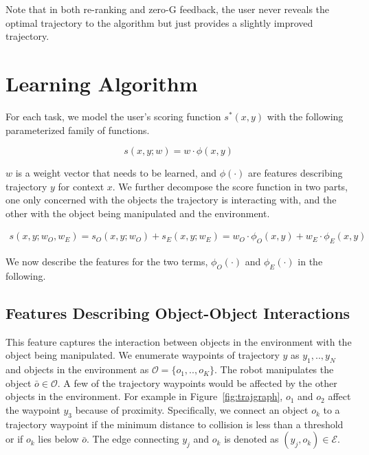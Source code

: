 Note that in both re-ranking and zero-G feedback, the user never reveals the optimal trajectory to the algorithm but just provides a slightly improved trajectory. 

\section{Learning Algorithm}

\label{sec:learningalgo}

For each task, we model the user's scoring function $s^*(x,y)$ with the following parameterized family of functions.

\begin{equation}
s(x,y;w) = w \cdot \phi(x,y)

\end{equation}

$w$ is a weight vector that needs to be learned, and $\phi(\cdot)$ are features describing trajectory $y$ for context $x$. We further decompose the score function in two parts, one only concerned with the objects the trajectory is interacting with, and the other with the object being manipulated and the environment.

\begin{align}
s(x,y;w_O,w_E) = s_O(x,y;w_O) + s_E(x,y;w_E) = w_O \cdot \phi_O(x,y) + w_E \cdot \phi_E(x,y)
\label{eq:scorefn}
\end{align}

We now describe the features for the two terms, $\phi_O(\cdot)$ and $\phi_E(\cdot)$ in the following.

\subsection{Features Describing Object-Object Interactions}

This feature captures the interaction between objects in the environment with the object being manipulated. We enumerate waypoints of trajectory $y$ as $y_1,..,y_N$ and objects in the environment as $\mathcal{O}=\{o_1,..,o_K\}$. The robot manipulates the object $\bar{o}\in \mathcal{O}$. 
A few of the trajectory waypoints would be affected by the other objects in the environment. For example in Figure~\ref{fig:trajgraph}, $o_1$ and $o_2$ affect the waypoint $y_3$ because of proximity. Specifically, we connect an object $o_k$ to a trajectory waypoint if the minimum distance to collision is less than a threshold or if $o_k$ lies below $\bar{o}$.  The edge connecting $y_j$ and $o_k$ is denoted as $(y_j,o_k)\in\mathcal{E}$. 

